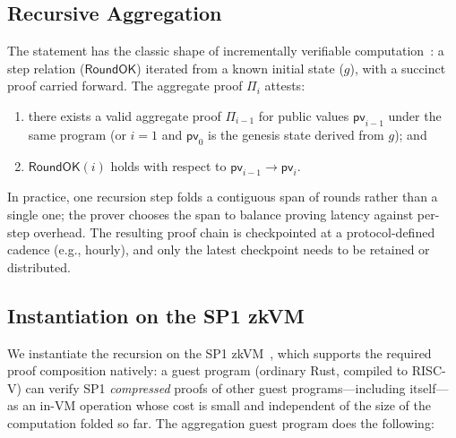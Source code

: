 \documentclass[twocolumn]{article}
\begin{document}
\subsection{Recursive Aggregation}

The statement has the classic shape of incrementally verifiable computation~\cite{valiant2008ivc}: a step relation ($\mathsf{RoundOK}$) iterated from a known initial state ($g$), with a succinct proof carried forward. The aggregate proof $\Pi_i$ attests:
\begin{enumerate}[nosep]
  \item there exists a valid aggregate proof $\Pi_{i-1}$ for public values $\mathsf{pv}_{i-1}$ under the same program (or $i = 1$ and $\mathsf{pv}_0$ is the genesis state derived from $g$); and
  \item $\mathsf{RoundOK}(i)$ holds with respect to $\mathsf{pv}_{i-1} \to \mathsf{pv}_i$.
\end{enumerate}
In practice, one recursion step folds a contiguous span of rounds rather than a single one; the prover chooses the span to balance proving latency against per-step overhead. The resulting proof chain is checkpointed at a protocol-defined cadence (e.g., hourly), and only the latest checkpoint needs to be retained or distributed.

\subsection{Instantiation on the SP1 zkVM}
\label{sec:sp1-instantiation}

We instantiate the recursion on the SP1 zkVM~\cite{sp1}, which supports the required proof composition natively: a guest program (ordinary Rust, compiled to RISC-V) can verify SP1 \emph{compressed} proofs of other guest programs---including itself---as an in-VM operation whose cost is small and independent of the size of the computation folded so far. The aggregation guest program does the following:
\end{document}
